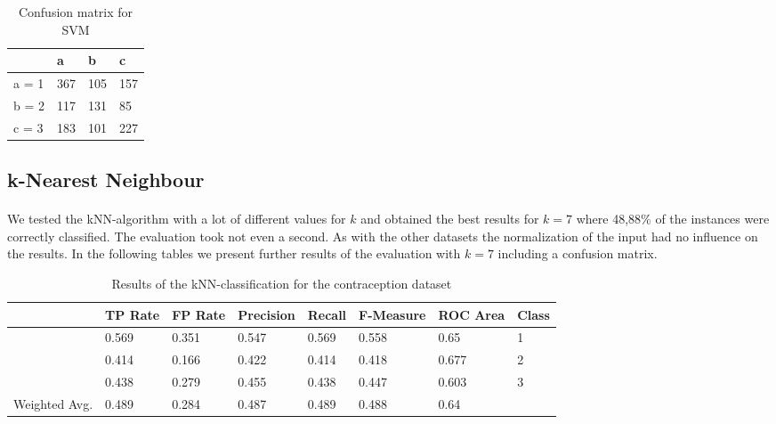 \documentclass[paper=a4, fontsize=11pt]{scrartcl} %
\numberwithin{equation}{section} %
\numberwithin{figure}{section} %
\numberwithin{table}{section} %
\begin{document}
\vspace{6pt}

\begin{table}[h]
\centering
\begin{tabular}{|l|lll|}
	\hline
	      &a   &b   &c \\
	\hline
	a = 1 &367 &105 &157 \\
 	b = 2 &117 &131 &85 \\
 	c = 3 &183 &101 &227 \\
  \hline
\end{tabular}
\caption{Confusion matrix for SVM}
\end{table}


\subsection{k-Nearest Neighbour}

\paragraph{}We tested the kNN-algorithm with a lot of different values for $k$ and obtained the best results for $k=7$ where 48,88\% of the instances were correctly classified. The evaluation took not even a second. As with the other datasets the normalization of the input had no influence on the results. In the following tables we present further results of the evaluation with $k=7$ including a confusion matrix.

\begin{table}[h]
\centering
\begin{tabular}{|llllllll|}
	\hline
	&								TP Rate   	&FP Rate   &Precision   &Recall  &F-Measure   &ROC Area  	&Class\\
	\hline
									&0.569     	&0.351     &0.547     	&0.569   &0.558      	&0.65     	&1\\
                 	&0.414     	&0.166     &0.422     	&0.414   &0.418      	&0.677    	&2\\
                 	&0.438     	&0.279     &0.455     	&0.438   &0.447      	&0.603    	&3\\
  \hline
	Weighted Avg.   &0.489     	&0.284     &0.487     	&0.489   &0.488      	&0.64			&\\
	\hline
\end{tabular}
\caption{Results of the kNN-classification for the contraception dataset}
\end{table}

\vspace{6pt}
\end{document}
